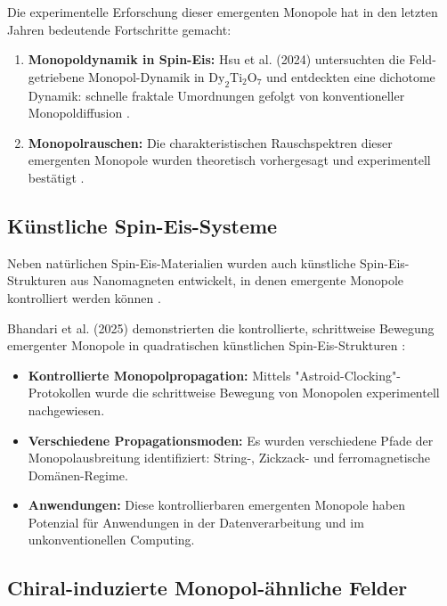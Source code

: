 Die experimentelle Erforschung dieser emergenten Monopole hat in den letzten Jahren bedeutende Fortschritte gemacht:

\begin{enumerate}
    \item \textbf{Monopoldynamik in Spin-Eis:} Hsu et al. (2024) untersuchten die Feld-getriebene Monopol-Dynamik in $\mathrm{Dy_2Ti_2O_7}$ und entdeckten eine dichotome Dynamik: schnelle fraktale Umordnungen gefolgt von konventioneller Monopoldiffusion \cite{Hsu2024, Blundell2024}.
    
    \item \textbf{Monopolrauschen:} Die charakteristischen Rauschspektren dieser emergenten Monopole wurden theoretisch vorhergesagt und experimentell bestätigt \cite{Dusad2019, Samarakoon2022}.
\end{enumerate}

\subsection{Künstliche Spin-Eis-Systeme}
\label{app:monopolforschung_artificial}

Neben natürlichen Spin-Eis-Materialien wurden auch künstliche Spin-Eis-Strukturen aus Nanomagneten entwickelt, in denen emergente Monopole kontrolliert werden können \cite{Ladak2010, Mengotti2011}.

Bhandari et al. (2025) demonstrierten die kontrollierte, schrittweise Bewegung emergenter Monopole in quadratischen künstlichen Spin-Eis-Strukturen \cite{Bhandari2025}:

\begin{itemize}
    \item \textbf{Kontrollierte Monopolpropagation:} Mittels "Astroid-Clocking"-Protokollen wurde die schrittweise Bewegung von Monopolen experimentell nachgewiesen.
    \item \textbf{Verschiedene Propagationsmoden:} Es wurden verschiedene Pfade der Monopolausbreitung identifiziert: String-, Zickzack- und ferromagnetische Domänen-Regime.
    \item \textbf{Anwendungen:} Diese kontrollierbaren emergenten Monopole haben Potenzial für Anwendungen in der Datenverarbeitung und im unkonventionellen Computing.
\end{itemize}

\subsection{Chiral-induzierte Monopol-ähnliche Felder}
\label{app:monopolforschung_chiral}

